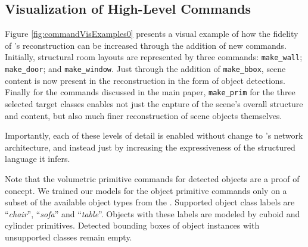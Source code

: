 \subsection{Visualization of High-Level Commands}

Figure \ref{fig:commandVisExamples0} presents a visual example of how the fidelity of \METHOD's reconstruction can be increased through the addition of new commands. 
Initially, structural room layouts are represented by three commands: \texttt{make\_wall}; \texttt{make\_door}; and \texttt{make\_window}.
Just through the addition of \texttt{make\_bbox}, scene content is now present in the reconstruction in the form of object detections.
Finally for the commands discussed in the main paper, \texttt{make\_prim} for the three selected target classes enables not just the capture of the scene's overall structure and content, but also much finer reconstruction of scene objects themselves. 

Importantly, each of these levels of detail is enabled without change to \METHOD's network architecture, and instead just by increasing the expressiveness of the structured language it infers.

Note that
the volumetric primitive commands for detected objects are a proof of concept.
We trained our models for the object primitive commands only on a subset
of the available object types from the \DatasetName{}.
Supported object class labels are ``\emph{chair}'', ``\emph{sofa}'' and ``\emph{table}''.
Objects with these labels are modeled by cuboid and cylinder primitives.
Detected bounding boxes of object instances with unsupported classes remain empty.
%


